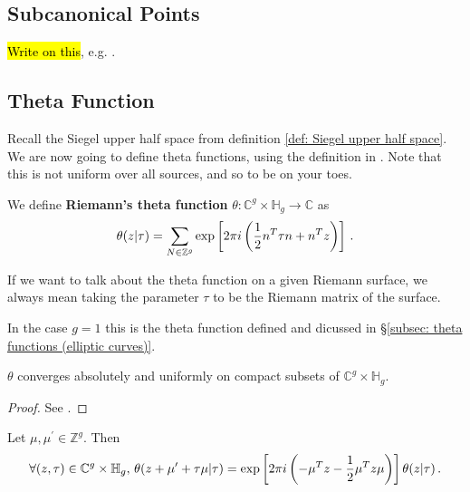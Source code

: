 \documentclass{article}
\begin{document}
\subsection{Subcanonical Points}
\hl{Write on this}, e.g. \cite{Bullock2011}.  
\subsection{Theta Function}\label{subsec: theta functions (riemann surfaces)}
Recall the Siegel upper half space from definition \ref{def: Siegel upper half space}. We are now going to define theta functions, using the definition in \cite{Farkas1992}. Note that this is not uniform over all sources, and so to be on your toes. 
\begin{definition}
	We define \textbf{Riemann's theta function} $\theta:\mathbb{C}^g \times \mathbb{H}_g \to \mathbb{C}$ as  
	\[
	\theta(z|\tau) = \sum_{N \in \mathbb{Z}^g} \exp \left[ 2\pi i \left( \frac{1}{2} n^T \tau n + n^Tz \right) \right] \, .
	\]
\end{definition}

\begin{remark}
	If we want to talk about the theta function on a given Riemann surface, we always mean taking the parameter $\tau$ to be the Riemann matrix of the surface. 
\end{remark}

\begin{remark}
	In the case $g=1$ this is the theta function defined and dicussed in \S \ref{subsec: theta functions (elliptic curves)}.
\end{remark}

\begin{prop}
	$\theta$ converges absolutely and uniformly on compact subsets of $\mathbb{C}^g \times \mathbb{H}_g$.
\end{prop}
\begin{proof}
	See \cite{Farkas1992}. 
\end{proof}

\begin{prop}[Periodicity]
	Let $\mu,\mu^\prime \in \mathbb{Z}^g$. Then 
	\[
	\forall (z,\tau) \in \mathbb{C}^g \times \mathbb{H}_g, \, \theta(z+\mu^\prime+ \tau\mu | \tau) = \exp\left[ 2\pi i \left( -\mu^T z - \frac{1}{2} \mu^T z \mu \right) \right]\theta(z | \tau) \, .
	\]
\end{prop}
\end{document}
